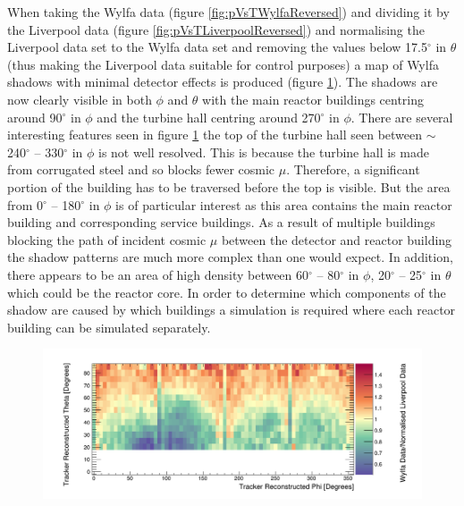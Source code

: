 When taking the Wylfa data (figure \ref{fig:pVsTWylfaReversed}) and dividing it by the Liverpool data (figure \ref{fig:pVsTLiverpoolReversed}) and normalising the Liverpool data set to the Wylfa data set and removing the values below 17.5$^\circ$ in $\theta$ (thus making the Liverpool data suitable for control purposes) a map of Wylfa shadows with minimal detector effects is produced (figure \ref{fig:measuredTrackerReconNoLines}). The shadows are now clearly visible in both $\phi$ and $\theta$ with the main reactor buildings centring around 90$^\circ$ in $\phi$ and the turbine hall centring around 270$^\circ$ in $\phi$. There are several interesting features seen in figure \ref{fig:measuredTrackerReconNoLines} the top of the turbine hall seen between $\sim$ 240$^\circ$ -- 330$^\circ$ in $\phi$ is not well resolved. This is because the turbine hall is made from corrugated steel and so blocks fewer cosmic $\mu$. Therefore, a significant portion of the building has to be traversed before the top is visible. But the area from 0$^\circ$ -- 180$^\circ$ in $\phi$ is of particular interest as this area contains the main reactor building and corresponding service buildings. As a result of multiple buildings blocking the path of incident cosmic $\mu$ between the detector and reactor building the shadow patterns are much more complex than one would expect. In addition, there appears to be an area of high density between 60$^\circ$ -- 80$^\circ$ in $\phi$, 20$^\circ$ -- 25$^\circ$ in $\theta$ which could be the reactor core. In order to determine which components of the shadow are caused by which buildings a simulation is required where each reactor building can be simulated separately.

\begin{figure}[!h]
 \centering
 \includegraphics[width=\linewidth]{Chapter5/Figs/wylfaRasterNew/measuredTrackerReconNoLines.png}
 \label{fig:measuredTrackerReconNoLines}
\end{figure}


